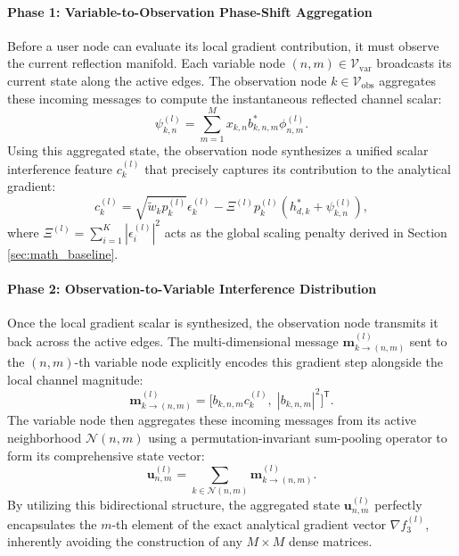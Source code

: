 \documentclass[journal]{IEEEtran}
\newcommand{\trans}{^{\mathsf{T}}}
\begin{document}
\paragraph{Phase 1: Variable-to-Observation Phase-Shift Aggregation}
Before a user node can evaluate its local gradient contribution, it must observe the current reflection manifold. Each variable node $(n,m) \in \mathcal{V}_{\text{var}}$ broadcasts its current state along the active edges. The observation node $k \in \mathcal{V}_{\text{obs}}$ aggregates these incoming messages to compute the instantaneous reflected channel scalar:
\begin{equation}
    \psi_{k,n}^{(l)} = \sum_{m=1}^M x_{k,n} b_{k,n,m}^* \phi_{n,m}^{(l)}.
\end{equation}
Using this aggregated state, the observation node synthesizes a unified scalar interference feature $c_k^{(l)}$ that precisely captures its contribution to the analytical gradient:
\begin{equation}
    c_k^{(l)} = \sqrt{\tilde{w}_k p_k^{(l)}} \epsilon_k^{(l)} - \Xi^{(l)} p_k^{(l)} \left( h_{d,k}^* + \psi_{k,n}^{(l)} \right),
\end{equation}
where $\Xi^{(l)} = \sum_{i=1}^K |\epsilon_i^{(l)}|^2$ acts as the global scaling penalty derived in Section \ref{sec:math_baseline}.

\paragraph{Phase 2: Observation-to-Variable Interference Distribution}
Once the local gradient scalar is synthesized, the observation node transmits it back across the active edges. The multi-dimensional message $\mathbf{m}_{k \to (n,m)}^{(l)}$ sent to the $(n,m)$-th variable node explicitly encodes this gradient step alongside the local channel magnitude:
\begin{equation}
    \mathbf{m}_{k \to (n,m)}^{(l)} = \Big[ b_{k,n,m} c_k^{(l)}, \; |b_{k,n,m}|^2 \Big]\trans.
\end{equation}
The variable node then aggregates these incoming messages from its active neighborhood $\mathcal{N}(n,m)$ using a permutation-invariant sum-pooling operator to form its comprehensive state vector:
\begin{equation}
    \mathbf{u}_{n,m}^{(l)} = \sum_{k \in \mathcal{N}(n,m)} \mathbf{m}_{k \to (n,m)}^{(l)}.
\end{equation}
By utilizing this bidirectional structure, the aggregated state $\mathbf{u}_{n,m}^{(l)}$ perfectly encapsulates the $m$-th element of the exact analytical gradient vector $\nabla f_3^{(l)}$, inherently avoiding the construction of any $M \times M$ dense matrices.
\end{document}
